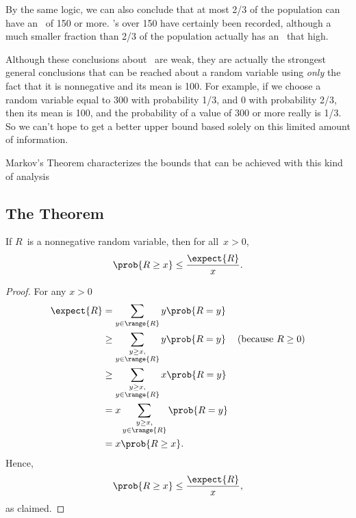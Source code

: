 By the same logic, we can also conclude that at most 2/3 of the
population can have an \IQ\ of 150 or more.  \IQ's over 150 have
certainly been recorded, although a much smaller fraction than 2/3 of
the population actually has an \IQ\ that high.

Although these conclusions about \IQ\ are weak, they are actually the
strongest general conclusions that can be reached about a random
variable using \emph{only} the fact that it is nonnegative and its
mean is 100.  For example, if we choose a random variable equal to 300
with probability 1/3, and 0 with probability 2/3, then its mean is
100, and the probability of a value of 300 or more really is 1/3.  So
we can't hope to get a better upper bound based solely on this limited
amount of information.

Markov's Theorem characterizes the bounds that can be achieved with
this kind of analysis

\subsection{The Theorem}

\begin{theorem}\label{thm:markov}
  If $R$~is a nonnegative random variable, then for all~$x > 0$,
  \begin{equation*}
    \prob{R \geq x} \leq \frac{\expect{R}}{x}.
  \end{equation*}
\end{theorem}

\begin{proof}%
For any $x > 0$
\begin{align}
  \expect{R}
  & = \sum_{y \in \range{R}} y\prob{R=y}\notag\\
  & \geq \sum_{\substack{y \geq x,\\ y \in \range{R}}} y\prob{R=y} & \text{(because $R \geq 0$)}\notag\\
  & \geq \sum_{\substack{y \geq x,\\ y \in \range{R}}} x\prob{R=y}\notag\\
  & = x \sum_{\substack{y \geq x,\\ y \in \range{R}}} \prob{R=y}\notag\\
  & = x \prob{R \geq x}.\label{markovproof}
\end{align}
Hence,
\begin{equation*}
    \prob{R \ge x} \le \frac{\expect{R}}{x},
\end{equation*}
as claimed.
\end{proof}

